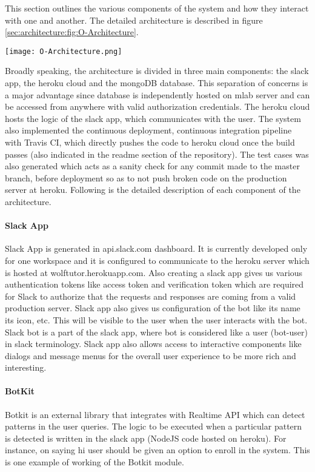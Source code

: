This section outlines the various components of the system and how they interact with one and another. The detailed architecture is described in figure \ref{sec:architecture:fig:O-Architecture}.

\begin{figure*}[ht]
\label{sec:architecture:fig:O-Architecture}
\caption{Original Architecture Design}
\centering
\texttt{[image: O-Architecture.png]}
\end{figure*}

Broadly speaking, the architecture is divided in three main components: the slack app, the heroku cloud and the mongoDB database. This separation of concerns is a major advantage since database is independently hosted on mlab server and can be accessed from anywhere with valid authorization credentials. The heroku cloud hosts the logic of the slack app, which communicates with the user. The system also implemented the continuous deployment, continuous integration pipeline with Travis CI, which directly pushes the code to heroku cloud once the build passes (also indicated in the readme section of the repository). The test cases was also generated which acts as a sanity check for any commit made to the master branch, before deployment so as to not push broken code on the production server at heroku. Following is the detailed description of each component of the architecture.

\paragraph{Slack App}
Slack App is generated in api.slack.com dashboard. It is currently developed only for one workspace and it is configured to communicate to the heroku server which is hosted at wolftutor.herokuapp.com. Also creating a slack app gives us various authentication tokens like access token and verification token which are required for Slack to authorize that the requests and responses are coming from a valid production server. Slack app also gives us configuration of the bot like its name its icon, etc. This will be visible to the user when the user interacts with the bot. Slack bot is a part of the slack app, where bot is considered like a user (bot-user) in slack terminology. Slack app also allows access to interactive components like dialogs and message menus for the overall user experience to be more rich and interesting.

\paragraph{BotKit}
Botkit is an external library that integrates with Realtime API which can detect patterns in the user queries. The logic to be executed when a particular pattern is detected is written in the slack app (NodeJS code hosted on heroku). For instance, on saying hi user should be given an option to enroll in the system. This is one example of working of the Botkit module.

